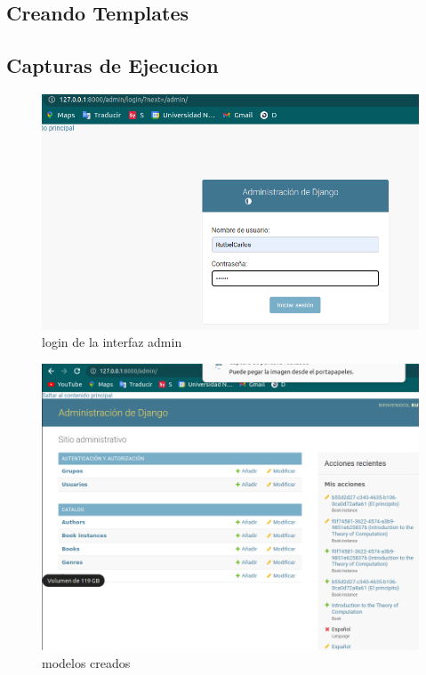 \documentclass{article}
\begin{document}
\subsection{Creando Templates}


\subsection{Capturas de Ejecucion}
\begin{figure}[H]
    \centering
    \includegraphics[scale=0.5]{img/exe/login-admin.png}
    \caption{login de la interfaz admin}
\end{figure}
\begin{figure}[H]
    \centering
    \includegraphics[scale=0.4]{img/exe/modelos creados.png}
    \caption{modelos creados}
\end{figure}
\end{document}
